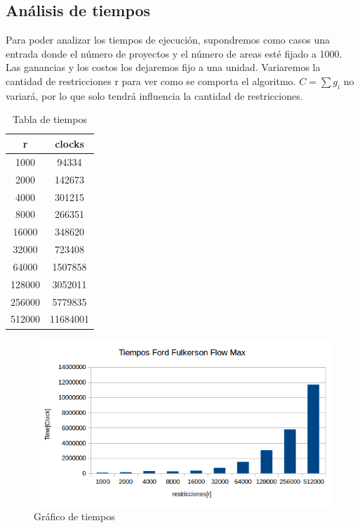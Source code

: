 \subsection{Análisis de tiempos}
Para poder analizar los tiempos de ejecución, supondremos como casos una entrada donde el número de proyectos y el número de areas esté fijado a 1000. Las ganancias y los costos los 
dejaremos fijo a una unidad. 
Variaremos la cantidad de restricciones r para ver como se comporta el algoritmo.
$C = \sum g_i$ no variará, por lo que solo tendrá influencia la cantidad de restricciones.


\begin{table}[H]
\centering
\begin{tabular}{|c|c|}
\hline
r 	& clocks       \\ \hline
1000    & 94334        \\ \hline
2000    & 142673       \\ \hline
4000    & 301215       \\ \hline
8000    & 266351       \\ \hline
16000   & 348620       \\ \hline
32000   & 723408       \\ \hline
64000   & 1507858      \\ \hline
128000  & 3052011      \\ \hline
256000  & 5779835      \\ \hline
512000  & 11684001     \\ \hline
\end{tabular}
\caption{Tabla de tiempos}
\end{table}

\begin{figure}[H]
\centering
\includegraphics[width=\textwidth]{FlujoDeRedes/tiempos.png}
\caption{Gráfico de tiempos}
\end{figure}

